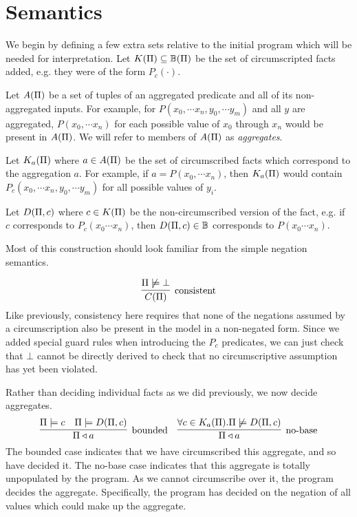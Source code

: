 \section{Semantics}
\label{formal:sec:semantics}
We begin by defining a few extra sets relative to the initial program which will be needed for interpretation.
Let $K(\Pi) \subseteq \mathbb{B}(\Pi)$ be the set of circumscripted facts added, e.g. they were of the form $P_c(\cdot)$.

Let $A(\Pi)$ be a set of tuples of an aggregated predicate and all of its non-aggregated inputs.
For example, for $P(x_0, \cdots x_n, y_0, \cdots y_m)$ and all $y$ are aggregated, $P(x_0, \cdots x_n)$ for each possible value of $x_0$ through $x_n$ would be present in $A(\Pi)$.
We will refer to members of $A(\Pi)$ as \emph{aggregates}.

Let $K_a(\Pi)$ where $a \in A(\Pi)$ be the set of circumscribed facts which correspond to the aggregation $a$.
For example, if $a = P(x_0, \cdots x_n)$, then $K_a(\Pi)$ would contain $P_c(x_0, \cdots x_n, y_0, \cdots y_m)$ for all possible values of $y_i$.

Let $D(\Pi, c)$ where $c \in K(\Pi)$ be the non-circumscribed version of the fact, e.g. if $c$ corresponds to $P_c(x_0 \cdots x_n)$, then $D(\Pi, c) \in \mathbb{B}$ corresponds to $P(x_0 \cdots x_n)$.

Most of this construction should look familiar from the simple negation semantics.

\[
	\infer[\textrm{consistent}]{\cons{\Pi}}{\Pi \not \models \bot}
\]
Like previously, consistency here requires that none of the negations assumed by a circumscription also be present in the model in a non-negated form.
Since we added special guard rules when introducing the $P_c$ predicates, we can just check that $\bot$ cannot be directly derived to check that no circumscriptive assumption has yet been violated.

Rather than deciding individual facts as we did previously, we now decide aggregates.
\[
	\infer[\textrm{bounded}]{\Pi \decides a}{\Pi \models c & \Pi \models \decirc{\Pi}{c}}
	\quad
	\infer[\textrm{no-base}]{\Pi \decides a}{\forall c \in \circset_a(\Pi). \Pi \not \models \decirc{\Pi}{c}}
\]
The bounded case indicates that we have circumscribed this aggregate, and so have decided it.
The no-base case indicates that this aggregate is totally unpopulated by the program.
As we cannot circumscribe over it, the program decides the aggregate.
Specifically, the program has decided on the negation of all values which could make up the aggregate.

